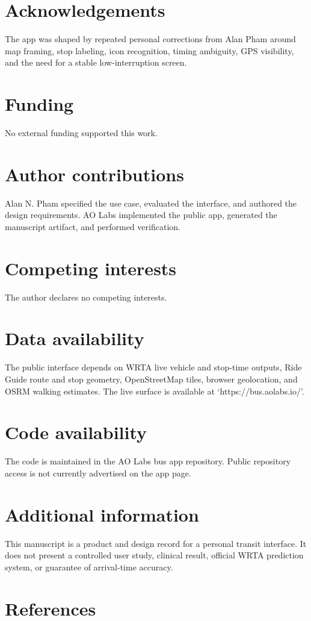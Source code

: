 \documentclass[12pt,letterpaper]{article}
\begin{document}
\section{Acknowledgements}

The app was shaped by repeated personal corrections from Alan Pham around map framing, stop labeling, icon recognition, timing ambiguity, GPS visibility, and the need for a stable low-interruption screen.

\section{Funding}

No external funding supported this work.

\section{Author contributions}

Alan N. Pham specified the use case, evaluated the interface, and authored the design requirements. AO Labs implemented the public app, generated the manuscript artifact, and performed verification.

\section{Competing interests}

The author declares no competing interests.

\section{Data availability}

The public interface depends on WRTA live vehicle and stop-time outputs, Ride Guide route and stop geometry, OpenStreetMap tiles, browser geolocation, and OSRM walking estimates. The live surface is available at `https://bus.aolabs.io/'.

\section{Code availability}

The code is maintained in the AO Labs bus app repository. Public repository access is not currently advertised on the app page.

\section{Additional information}

This manuscript is a product and design record for a personal transit interface. It does not present a controlled user study, clinical result, official WRTA prediction system, or guarantee of arrival-time accuracy.

\section{References}

\printbibliography[heading=none]
\end{document}

